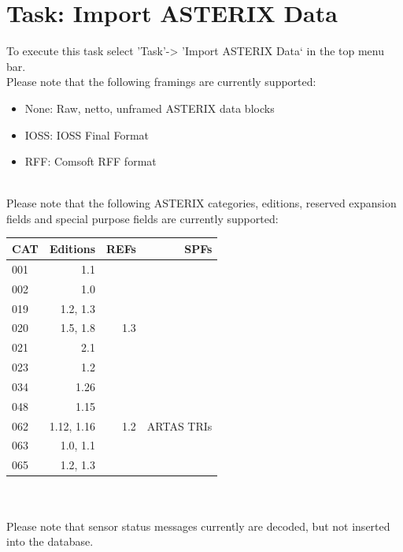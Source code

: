 \section{Task: Import ASTERIX Data}
\label{sec:task_import_asterix}

To execute this task select 'Task'->  'Import ASTERIX Data` in the top menu bar. \\

Please note that the following framings are currently supported:
\begin{itemize}  
\item None: Raw, netto, unframed ASTERIX data blocks
\item IOSS: IOSS Final Format
\item RFF: Comsoft RFF format
\end{itemize}
\ \\

Please note that the following ASTERIX categories, editions, reserved expansion fields and special purpose fields are currently supported: \\

\begin{tabular}{ | l | r | r | r |}
\hline
  CAT & Editions & REFs & SPFs  \\ \hline
  001 & 1.1 &  &  \\ \hline
  002 & 1.0 &  &  \\ \hline
  019 & 1.2, 1.3 & & \\ \hline
  020 & 1.5, 1.8 & 1.3 & \\ \hline
  021 & 2.1 & & \\ \hline
  023 & 1.2 & & \\ \hline
  034 & 1.26 & & \\ \hline
  048 & 1.15 & & \\ \hline
  062 & 1.12, 1.16 & 1.2 & ARTAS TRIs \\ \hline
  063 & 1.0, 1.1 & & \\ \hline
  065 & 1.2, 1.3 & & \\ \hline
\end{tabular} \\
\  \\

Please note that sensor status messages currently are decoded, but not inserted into the database.

